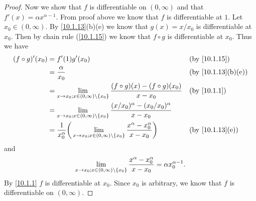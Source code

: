 \begin{proof}
  Now we show that \(f\) is differentiable on \((0, \infty)\) and that \(f'(x) = \alpha x^{\alpha - 1}\).
  From proof above we know that \(f\) is differentiable at \(1\).
  Let \(x_0 \in (0, \infty)\).
  By \cref{10.1.13}(b)(e) we know that \(g(x) = x / x_0\) is differentiable at \(x_0\).
  Then by chain rule (\cref{10.1.15}) we know that \(f \circ g\) is differentiable at \(x_0\).
  Thus we have
  \begin{align*}
    (f \circ g)'(x_0) & = f'(1) g'(x_0)                                                                                                                           &  & \by{10.1.15}                     \\
                      & = \dfrac{\alpha}{x_0}                                                                                                                     &  & \text{(by \cref{10.1.13}(b)(e))} \\
                      & = \lim_{x \to x_0 ; x \in (0, \infty) \setminus \set{x_0}} \dfrac{(f \circ g)(x) - (f \circ g)(x_0)}{x - x_0}                             &  & \by{10.1.1}                      \\
                      & = \lim_{x \to x_0 ; x \in (0, \infty) \setminus \set{x_0}} \dfrac{(x / x_0)^{\alpha} - (x_0 / x_0)^{\alpha}}{x - x_0}                                                           \\
                      & = \dfrac{1}{x_0^{\alpha}} \bigg(\lim_{x \to x_0 ; x \in (0, \infty) \setminus \set{x_0}} \dfrac{x^{\alpha} - x_0^{\alpha}}{x - x_0}\bigg) &  & \text{(by \cref{10.1.13}(e))}
  \end{align*}
  and
  \[
    \lim_{x \to x_0 ; x \in (0, \infty) \setminus \left\lbrace x_0\right\rbrace} \dfrac{x^{\alpha} - x_0^{\alpha}}{x - x_0} = \alpha x_0^{\alpha - 1}.
  \]
  By \cref{10.1.1} \(f\) is differentiable at \(x_0\).
  Since \(x_0\) is arbitrary, we know that \(f\) is differentiable on \((0, \infty)\).
\end{proof}

